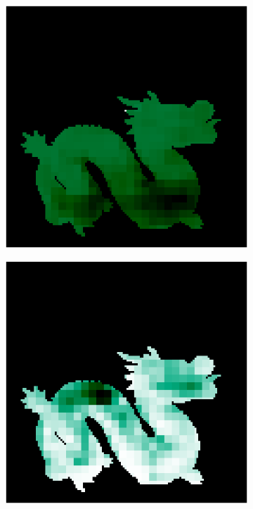 \begin{figure}[H]
\begin{minipage}{0.32\linewidth}
		\end{minipage}
		\begin{minipage}{0.32\linewidth}
				\begin{subfigure}[t]{0.45\linewidth}
					\includegraphics[width=\linewidth]{./Figures/feature_map_gcnn/feature_map_gcnn-gcnn_1.png}
				\end{subfigure}
				\begin{subfigure}[t]{0.45\linewidth}
					\includegraphics[width=\linewidth]{./Figures/feature_map_gcnn/feature_map_gcnn-gcnn_9.png}
				\end{subfigure}
			

\end{minipage}
\end{figure}
